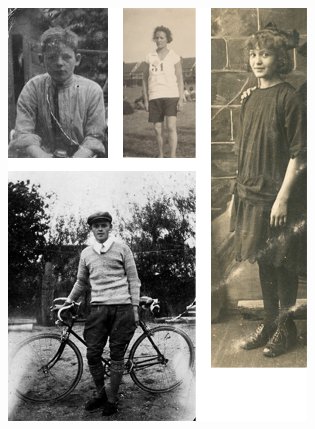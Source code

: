 \documentclass[12pt,twoside, openright]{memoir}
\begin{document}
\begin{figure}
\includegraphics[width=\textwidth]{img/ch4/ouders1}
\caption*{\footnotesize }
\end{figure}
\end{document}
